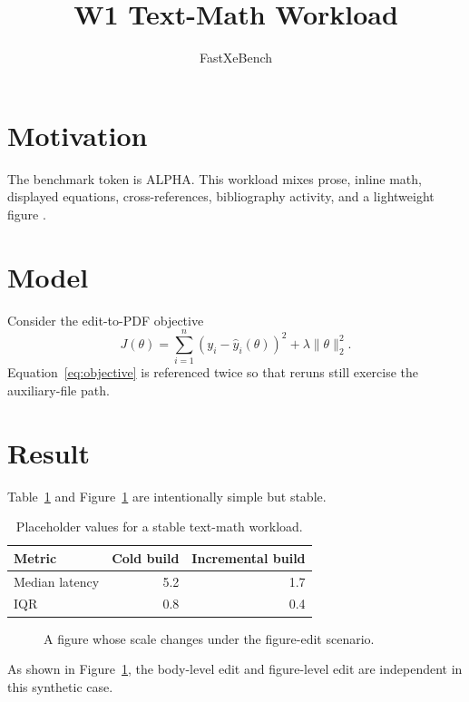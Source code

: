 \documentclass[11pt]{article}
\title{W1 Text-Math Workload}
\author{FastXeBench}
\date{}
\newcommand{\benchtexttoken}{ALPHA}
\newcommand{\benchfiguretoken}{1.00}
\begin{document}
\maketitle

\section{Motivation}
The benchmark token is \benchtexttoken. This workload mixes prose, inline math, displayed equations, cross-references, bibliography activity, and a lightweight figure \cite{refalpha}.

\section{Model}
Consider the edit-to-PDF objective
\begin{equation}
\label{eq:objective}
J(\theta) = \sum_{i=1}^{n} \left(y_i - \hat{y}_i(\theta)\right)^2 + \lambda \lVert \theta \rVert_2^2 .
\end{equation}
Equation~\eqref{eq:objective} is referenced twice so that reruns still exercise the auxiliary-file path.

\section{Result}
Table~\ref{tab:summary} and Figure~\ref{fig:triangle} are intentionally simple but stable.

\begin{table}[h]
\centering
\begin{tabular}{@{}lrr@{}}
\toprule
Metric & Cold build & Incremental build \\
\midrule
Median latency & 5.2 & 1.7 \\
IQR & 0.8 & 0.4 \\
\bottomrule
\end{tabular}
\caption{Placeholder values for a stable text-math workload.}
\label{tab:summary}
\end{table}

\begin{figure}[h]
\centering
{}
\caption{A figure whose scale changes under the figure-edit scenario.}
\label{fig:triangle}
\end{figure}

As shown in Figure~\ref{fig:triangle}, the body-level edit and figure-level edit are independent in this synthetic case.



\end{document}
